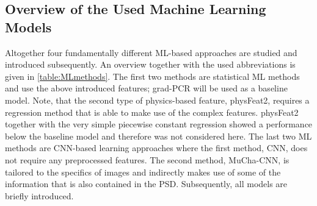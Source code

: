 \documentclass[11pt, authoryear]{elsarticle}
\begin{document}
	\subsection{Overview of the Used Machine Learning Models}
	Altogether four fundamentally different \gls{ML}-based approaches are studied 
	and introduced subsequently.  An overview together with the used
	abbreviations is given in \cref{table:MLmethods}.
	The first two methods are statistical \gls{ML} methods and use the above 
	introduced features; grad-PCR will be used as a baseline model.
	Note, that the second type of physics-based feature, 
	physFeat2, requires a regression method that is able to make use of the
	complex features. physFeat2 together with the very simple piecewise constant 
	regression showed a performance below the baseline model and therefore was 
	not considered here.
	The last two \gls{ML} methods are CNN-based learning approaches where the 
	first method, CNN, does not require any preprocessed features. The second 
	method, MuCha-CNN, is tailored to the specifics of images and indirectly makes 
	use of some of the information that is also contained in the \gls{PSD}.
	Subsequently, all models are briefly introduced.
	
\end{document}
